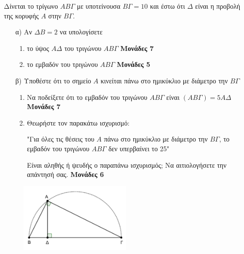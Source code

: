 \documentclass[12pt]{extarticle}
\begin{document}
Δίνεται το τρίγωνο $ΑΒΓ$ με υποτείνουσα $ΒΓ=10$ και έστω ότι $Δ$ είναι η προβολή της κορυφής $Α$ στην $ΒΓ$.
\begin{enumerate}
    \item[α)] Αν $ΔΒ=2$ να υπολογίσετε
        \begin{enumerate}
            \item το ύψος $ΑΔ$ του τριγώνου $ΑΒΓ$ \hspace*{\fill} \textbf{Μονάδες 7}
            \item το εμβαδόν του τριγώνου $ΑΒΓ$ \hspace*{\fill} \textbf{Μονάδες 5}
        \end{enumerate}

    \item[β)] Υποθέστε ότι το σημείο $Α$ κινείται πάνω στο ημικύκλιο με διάμετρο την $ΒΓ$
        \begin{enumerate}
            \item Να ποδείξετε ότι το εμβαδόν του τριγώνου $ΑΒΓ$ είναι $(ΑΒΓ)=5ΑΔ$ \hspace*{\fill} \textbf{Μονάδες 7}
            \item Θεωρήστε τον παρακάτω ισχυρισμό:

                  "Για όλες τις θέσεις του $Α$ πάνω στο ημικύκλιο με διάμετρο την $ΒΓ$, το εμβαδόν του τριγώνου $ΑΒΓ$ δεν υπερβαίνει το 25"

                  Είναι αληθής ή ψευδής ο παραπάνω ισχυρισμός; Να αιτιολογήσετε την απάντησή σας. \hspace*{\fill} \textbf{Μονάδες 6}
        \end{enumerate}
\end{enumerate}
\begin{figure}[h]

    \centering
    \includegraphics[width=0.50\textwidth]{2023(4)}
\end{figure}
\end{document}
